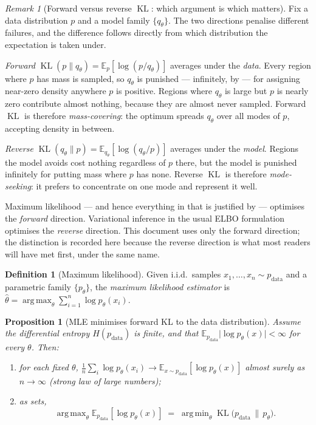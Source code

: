 \documentclass[11pt,a4paper]{report}
\newtheorem{proposition}[proposition]{Proposition}
\theoremstyle{definition}
\newtheorem{definition}[definition]{Definition}
\theoremstyle{remark}
\newtheorem{remark}[remark]{Remark}
\DeclareMathOperator*{\argmin}{arg\,min}
\DeclareMathOperator*{\argmax}{arg\,max}
\DeclareMathOperator{\KL}{KL}
\newcommand{\EE}{\mathbb E}
\begin{document}
\begin{remark}[Forward versus reverse $\KL$: which argument is which matters]
\label{rem:forward-reverse-kl}
Fix a data distribution $p$ and a model family $\{q_\theta\}$. The two
directions penalise different failures, and the difference follows directly
from which distribution the expectation is taken under.

\emph{Forward} $\KL(p\|q_\theta)=\EE_p[\log(p/q_\theta)]$ averages under the
\emph{data}. Every region where $p$ has mass is sampled, so $q_\theta$ is
punished --- infinitely, by  --- for assigning
near-zero density anywhere $p$ is positive. Regions where $q_\theta$ is large
but $p$ is nearly zero contribute almost nothing, because they are almost
never sampled. Forward $\KL$ is therefore \emph{mass-covering}: the optimum
spreads $q_\theta$ over all modes of $p$, accepting density in between.

\emph{Reverse} $\KL(q_\theta\|p)=\EE_{q_\theta}[\log(q_\theta/p)]$ averages
under the \emph{model}. Regions the model avoids cost nothing regardless of
$p$ there, but the model is punished infinitely for putting mass where $p$ has
none. Reverse $\KL$ is therefore \emph{mode-seeking}: it prefers to
concentrate on one mode and represent it well.

Maximum likelihood --- and hence everything in
 that is justified by
 --- optimises the \emph{forward} direction. Variational
inference in the usual ELBO formulation optimises the \emph{reverse}
direction. This document uses only the forward direction; the distinction is
recorded here because the reverse direction is what most readers will have
met first, under the same name.
\end{remark}

\begin{definition}[Maximum likelihood]
\label{def:mle}
Given i.i.d.\ samples $x_1,\dots,x_n\sim p_{\mathrm{data}}$ and a
parametric family $\{p_\theta\}$, the \emph{maximum likelihood estimator} is
$\hat\theta = \argmax_\theta \sum_{i=1}^n\log p_\theta(x_i)$.
\end{definition}

\begin{proposition}[MLE minimises forward KL to the data distribution]
\label{prop:mle-kl}
Assume the differential entropy $H(p_{\mathrm{data}})$ is finite, and that
$\EE_{p_{\mathrm{data}}}\lvert\log p_\theta(x)\rvert<\infty$ for every
$\theta$. Then:
\begin{enumerate}[nosep,label=(\roman*)]
\item for each fixed $\theta$,
$\tfrac1n\sum_i \log p_\theta(x_i) \to \EE_{x\sim p_{\mathrm{data}}}[\log p_\theta(x)]$
almost surely as $n\to\infty$ (strong law of large numbers);
\item as \emph{sets},
\[
\argmax_\theta \EE_{p_{\mathrm{data}}}[\log p_\theta(x)]
\;=\;
\argmin_\theta \KL\bigl(p_{\mathrm{data}}\,\|\,p_\theta\bigr) .
\]
\end{enumerate}
\end{proposition}
\end{document}
